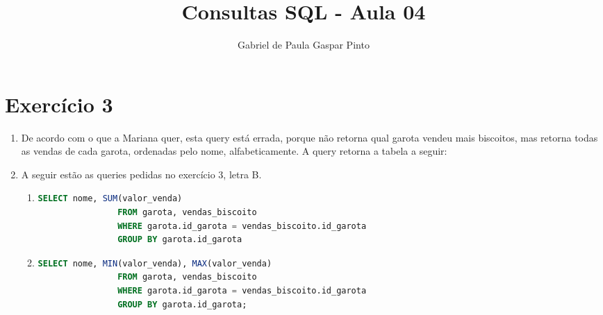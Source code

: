 \documentclass{article}
\title{Consultas SQL - Aula 04}
\author{Gabriel de Paula Gaspar Pinto}
\date{}
\begin{document}
\maketitle

\section*{Exercício 3}

\begin{enumerate}[label=\alph*.]
    \item De acordo com o que a Mariana quer, esta query está errada, porque não retorna qual garota vendeu mais biscoitos, mas retorna todas as vendas de cada garota, ordenadas pelo nome, alfabeticamente. A query retorna a tabela a seguir:
    
    \begin{center}
    \end{center}

    \item A seguir estão as queries pedidas no exercício 3, letra B.
    \begin{enumerate}[label=\roman*., labelsep=0.5em, leftmargin=*]
        
        \item 
        \begin{adjustwidth}{1em}{0pt}
            \begin{lstlisting}[language=SQL]
                SELECT nome, SUM(valor_venda)
                FROM garota, vendas_biscoito
                WHERE garota.id_garota = vendas_biscoito.id_garota
                GROUP BY garota.id_garota
            \end{lstlisting}
        \end{adjustwidth}

        \item
        \begin{adjustwidth}{1em}{0pt}
            \begin{lstlisting}[language=SQL]
                SELECT nome, MIN(valor_venda), MAX(valor_venda)
                FROM garota, vendas_biscoito
                WHERE garota.id_garota = vendas_biscoito.id_garota
                GROUP BY garota.id_garota;
            \end{lstlisting}
        \end{adjustwidth}


\end{enumerate}
\end{enumerate}
\end{document}
